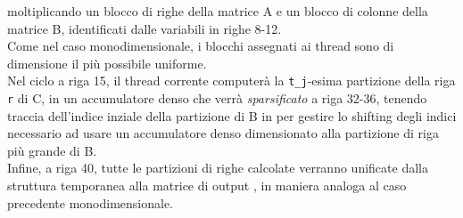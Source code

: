 moltiplicando un blocco di righe della matrice A e un blocco di colonne della matrice B,
identificati dalle variabili in righe 8-12.\\
Come nel caso monodimensionale, i blocchi assegnati ai thread sono di dimensione il più possibile uniforme.\\
Nel ciclo a riga 15, il thread corrente computerà la \verb|t_j|-esima partizione della riga \verb|r| di C, 
in un accumulatore denso che verrà \emph{sparsificato} a riga 32-36,
tenendo traccia dell'indice inziale della partizione di B in  per gestire lo 
shifting degli indici necessario ad usare un accumulatore denso dimensionato alla 
partizione di riga più grande di B.\\
Infine, a riga 40, tutte le partizioni di righe calcolate verranno unificate dalla struttura 
temporanea  alla matrice di output ,
in maniera analoga al caso precedente monodimensionale.\\

\clearpage
